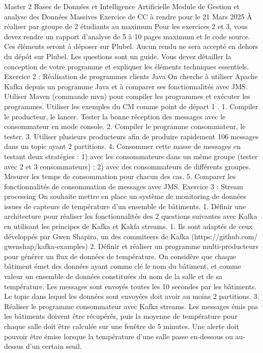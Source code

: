 \usepackage{booktabs}Master 2 Bases de Données et Intelligence Artificielle
Module de Gestion et analyse des Données Massives
Exercice de CC à rendre pour le 21 Mars 2025
À réaliser par groupe de 2 étudiants au maximum
Pour les exercices 2 et 3, vous devez rendre un rapport d’analyse de 5 à 10 pages maximum et
le code source. Ces éléments seront à déposer sur Plubel. Aucun rendu ne sera accepté en dehors du
dépôt sur Plubel. Les questions sont un guide. Vous devez détailler la conception de votre programme
et expliquer les éléments techniques essentiels.
Exercice 2 : Réalisation de programmes clients Java
On cherche à utiliser Apache Kafka depuis un programme Java et à comparer ses fonctionnalités
avec JMS. Utiliser Maven (commande mvn) pour compiler les programmes et exécuter les programmes.
Utiliser les exemples du CM comme point de départ 1
.
1. Compiler le producteur, le lancer. Tester la bonne réception des messages avec le consommateur
en mode console.
2. Compiler le programme consommateur, le tester.
3. Utiliser plusieurs producteurs afin de produire rapidement 106 messages dans un topic ayant 2
partitions.
4. Consommer cette masse de messages en testant deux stratégies : 1) avec les consommateurs dans
un même groupe (tester avec 2 et 3 consommateurs) ; 2) avec des consommateurs de différents
groupes. Mesurer les temps de consommation pour chacun des cas.
5. Comparer les fonctionnalités de consommation de messages avec JMS.
Exercice 3 : Stream processing
On souhaite mettre en place un système de monitoring de données issues de capteurs de température
d’un ensemble de bâtiments.
1. Définir une architecture pour réaliser les fonctionnalités des 2 questions suivantes avec Kafka
en utilisant les principes de Kafka et Kakfa streams.
1. Ils sont adaptés de ceux développés par Gwen Shapira, un des commiteers de Kafka (https://github.com/
gwenshap/kafka-examples)
2. Définir et réaliser un programme multi-producteurs pour générer un flux de données de température. On considère que chaque bâtiment émet des données ayant comme clé le nom du
bâtiment, et comme valeur un ensemble de données constituées du nom de la salle et de sa
température. Les messages sont envoyés toutes les 10 secondes par les bâtiments. Le topic dans
lequel les données sont envoyées doit avoir au moins 2 partitions.
3. Réaliser le programme consommateur avec Kafka streams. Les messages émis pas les bâtiments
doivent être récupérés, puis la moyenne de température pour chaque salle doit être calculée sur
une fenêtre de 5 minutes. Une alerte doit pouvoir être émise lorsque la température d’une salle
passe en-dessous ou au-dessus d’un certain seuil.


